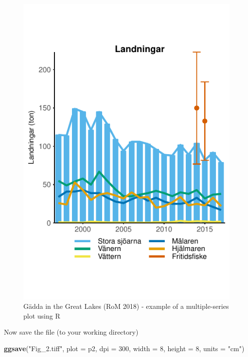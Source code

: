 \documentclass[]{article}
\newenvironment{Shaded}{\begin{snugshade}}{\end{snugshade}}
\newcommand{\KeywordTok}[1]{\textcolor[rgb]{0.13,0.29,0.53}{\textbf{#1}}}
\newcommand{\DataTypeTok}[1]{\textcolor[rgb]{0.13,0.29,0.53}{#1}}
\newcommand{\DecValTok}[1]{\textcolor[rgb]{0.00,0.00,0.81}{#1}}
\newcommand{\StringTok}[1]{\textcolor[rgb]{0.31,0.60,0.02}{#1}}
\newcommand{\NormalTok}[1]{#1}
\begin{document}
\begin{figure}

{\centering \includegraphics{Making_figures_for_RoM_in_R_files/figure-latex/plot 2-1} 

}

\caption{Gädda in the Great Lakes (RoM 2018) - example of a multiple-series plot using R}\label{fig:plot 2}
\end{figure}

Now save the file (to your working directory)

\begin{Shaded}
\begin{Highlighting}[]
\KeywordTok{ggsave}\NormalTok{(}\StringTok{"Fig_2.tiff"}\NormalTok{, }\DataTypeTok{plot =}\NormalTok{ p2, }\DataTypeTok{dpi =} \DecValTok{300}\NormalTok{, }\DataTypeTok{width =} \DecValTok{8}\NormalTok{, }\DataTypeTok{height =} \DecValTok{8}\NormalTok{, }\DataTypeTok{units =} \StringTok{"cm"}\NormalTok{)}
\end{Highlighting}
\end{Shaded}
\end{document}
